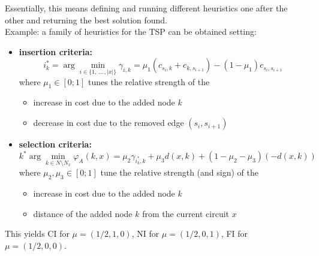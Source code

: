 Essentially, this means defining and running different heuristics one after the other and returning the best solution found.\\

Example: a family of heuristics for the TSP can be obtained setting:
\begin{itemize}
	\item \textbf{insertion criteria:}
	$$ i^\ast_k = \arg \min_{i \in \{1, \, ... \, , |x|\}} \gamma_{i,k} = \mu_1 (c_{s_i, k} + c_{k, s_{i+1}}) - (1 - \mu_1)c_{s_i, s_{i+1}} $$
	where $\mu_1 \in [0; 1]$ tunes the relative strength of the
	\begin{itemize}
		\item increase in cost due to the added node $k$
		\item decrease in cost due to the removed edge $(s_i , s_{i+1})$
	\end{itemize}
	
	\item \textbf{selection criteria:}
	$$ k^\ast \arg \min_{k \in N \setminus N_x} \varphi_A (k,x) = \mu_2 \gamma_{i_k^\ast, k} + \mu_3 d(x,k) + (1 - \mu_2 - \mu_3) (-d (x,k)) $$
	where $\mu_2, \mu_3 \in [0; 1]$ tune the relative strength (and sign) of the
	\begin{itemize}
		\item increase in cost due to the added node $k$
		\item distance of the added node $k$ from the current circuit $x$
	\end{itemize}
\end{itemize}

This yields CI for $\mu = (1/2, 1, 0)$, NI for $\mu = (1/2, 0, 1)$, FI for $\mu = (1/2, 0, 0)$.\\

\newpage

